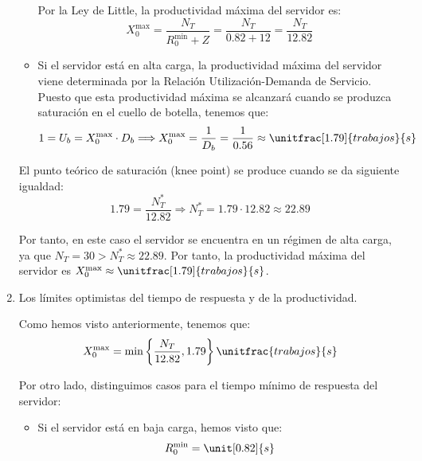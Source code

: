 \begin{ejercicio}
\begin{enumerate}
\begin{itemize}
            Por la Ley de Little, la productividad máxima del servidor es:
            \begin{equation*}
                X_0^{\text{max}} = \dfrac{N_T}{R_0^{\text{min}} + Z} = \dfrac{N_T}{0.82 + 12} = \dfrac{N_T}{12.82}
            \end{equation*}

            \item Si el servidor está en alta carga, la productividad máxima del servidor viene determinada por la Relación Utilización-Demanda de Servicio. Puesto que esta productividad máxima se alcanzará cuando se produzca saturación en el cuello de botella, tenemos que:
            \begin{equation*}
                1 = U_b = X_0^{\text{max}} \cdot D_b
                \Longrightarrow X_0^{\text{max}} = \dfrac{1}{D_b} = \dfrac{1}{0.56} \approx \unitfrac[1.79]{trabajos}{s}
            \end{equation*}
        \end{itemize}

        El punto teórico de saturación (knee point) se produce cuando se da siguiente igualdad:
        \begin{equation*}
            1.79 = \dfrac{N_T^*}{12.82}
            \Longrightarrow N_T^* = 1.79 \cdot 12.82 \approx 22.89
        \end{equation*}

        Por tanto, en este caso el servidor se encuentra en un régimen de alta carga, ya que $N_T = 30 > N_T^* \approx 22.89$. Por tanto, la productividad máxima del servidor es $X_0^{\text{max}} \approx \unitfrac[1.79]{trabajos}{s}$.

        \item Los límites optimistas del tiempo de respuesta y de la productividad.
        
        Como hemos visto anteriormente, tenemos que:
        \begin{equation*}
            X_0^{\text{max}} = \min\left\{\dfrac{N_T}{12.82}, 1.79\right\}\unitfrac{trabajos}{s}
        \end{equation*}

        Por otro lado, distinguimos casos para el tiempo mínimo de respuesta del servidor:
        \begin{itemize}
            \item Si el servidor está en baja carga, hemos visto que:
            \begin{equation*}
                R_0^{\text{min}} = \unit[0.82]{s}
            \end{equation*}


\end{itemize}
\end{enumerate}
\end{ejercicio}

